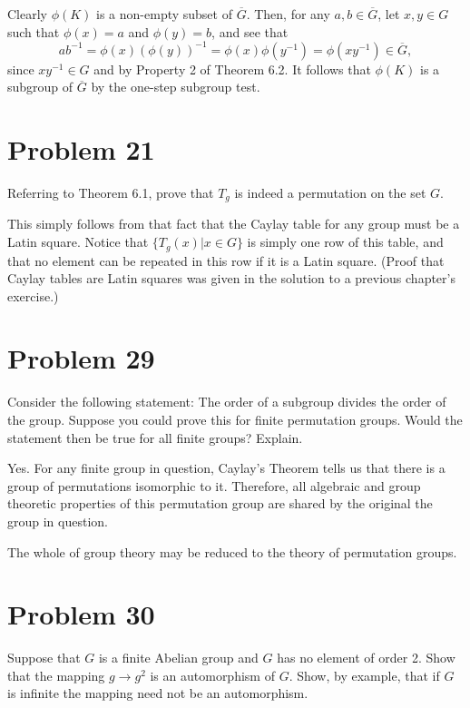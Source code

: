 \documentclass[12pt]{article}
\begin{document}
Clearly $\phi(K)$ is a non-empty subset of $\overline{G}$.
Then, for any $a,b\in\overline{G}$, let $x,y\in G$ such that $\phi(x)=a$ and $\phi(y)=b$,
and see that
\begin{equation*}
ab^{-1}=\phi(x)(\phi(y))^{-1}=\phi(x)\phi(y^{-1})=\phi(xy^{-1})\in\overline{G},
\end{equation*}
since $xy^{-1}\in G$ and by Property 2 of Theorem 6.2.  It follows that
$\phi(K)$ is a subgroup of $\overline{G}$ by the one-step subgroup test.

\section*{Problem 21}

Referring to Theorem 6.1, prove that $T_g$ is indeed a permutation on the set $G$.

This simply follows from that fact that the Caylay table for any group must be a Latin square.
Notice that $\{T_g(x)|x\in G\}$ is simply one row of this table, and that no element can be
repeated in this row if it is a Latin square.  (Proof that Caylay tables are Latin squares
was given in the solution to a previous chapter's exercise.)

\section*{Problem 29}

Consider the following statement: The order of a subgroup divides the order of the group.
Suppose you could prove this for finite permutation groups.  Would the statement then be true for all
finite groups?  Explain.

Yes.  For any finite group in question, Caylay's Theorem tells us that there
is a group of permutations isomorphic to it.  Therefore, all algebraic and group theoretic properties
of this permutation group are shared by the original the group in question.

The whole of group theory may be reduced to the theory of permutation groups.

\section*{Problem 30}

Suppose that $G$ is a finite Abelian group and $G$ has no element of order 2.
Show that the mapping $g\to g^2$ is an automorphism of $G$.  Show, by example,
that if $G$ is infinite the mapping need not be an automorphism.
\end{document}
